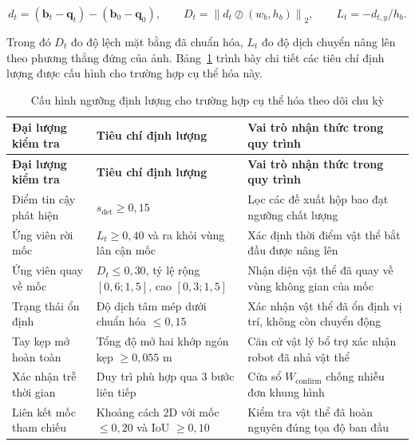 \begin{equation}
d_t = (\mathbf b_t - \mathbf q_t) - (\mathbf b_0 - \mathbf q_0),\qquad
D_t = \left\| d_t \oslash (w_b, h_b) \right\|_2,\qquad
L_t = -d_{t,y} / h_b.
\label{eq:case-study-geometry}
\end{equation}

Trong đó $D_t$ đo độ lệch mặt bằng đã chuẩn hóa, $L_t$ đo độ dịch chuyển nâng lên theo phương thẳng đứng của ảnh. Bảng~\ref{tab:case-study-thresholds} trình bày chi tiết các tiêu chí định lượng được cấu hình cho trường hợp cụ thể hóa này.

\begingroup\small\setlength{\tabcolsep}{4pt}\renewcommand{\arraystretch}{1.15}
\begin{longtable}{>{\raggedright\arraybackslash}p{}>{\raggedright\arraybackslash}p{}>{\raggedright\arraybackslash}p{}}
\caption{Cấu hình ngưỡng định lượng cho trường hợp cụ thể hóa theo dõi chu kỳ}\label{tab:case-study-thresholds}\\
\toprule
\textbf{Đại lượng kiểm tra} & \textbf{Tiêu chí định lượng} & \textbf{Vai trò nhận thức trong quy trình} \\
\midrule\endfirsthead
\toprule
\textbf{Đại lượng kiểm tra} & \textbf{Tiêu chí định lượng} & \textbf{Vai trò nhận thức trong quy trình} \\
\midrule\endhead
\bottomrule\endfoot
Điểm tin cậy phát hiện & $s_{\mathrm{det}} \ge 0{,}15$ & Lọc các đề xuất hộp bao đạt ngưỡng chất lượng \\
Ứng viên rời mốc & $L_t \ge 0{,}40$ và ra khỏi vùng lân cận mốc & Xác định thời điểm vật thể bắt đầu được nâng lên \\
Ứng viên quay về mốc & $D_t \le 0{,}30$, tỷ lệ rộng $[0{,}6; 1{,}5]$, cao $[0{,}3; 1{,}5]$ & Nhận diện vật thể đã quay về vùng không gian của mốc \\
Trạng thái ổn định & Độ dịch tâm mép dưới chuẩn hóa $\le 0{,}15$ & Xác nhận vật thể đã ổn định vị trí, không còn chuyển động \\
Tay kẹp mở hoàn toàn & Tổng độ mở hai khớp ngón kẹp $\ge 0{,}055$ m & Căn cứ vật lý bổ trợ xác nhận robot đã nhả vật thể \\
Xác nhận trễ thời gian & Duy trì phù hợp qua 3 bước liên tiếp & Cửa sổ $W_{\mathrm{confirm}}$ chống nhiễu đơn khung hình \\
Liên kết mốc tham chiếu & Khoảng cách 2D với mốc $\le 0{,}20$ và IoU $\ge 0{,}10$ & Kiểm tra vật thể đã hoàn nguyên đúng tọa độ ban đầu \\
\end{longtable}
\endgroup

